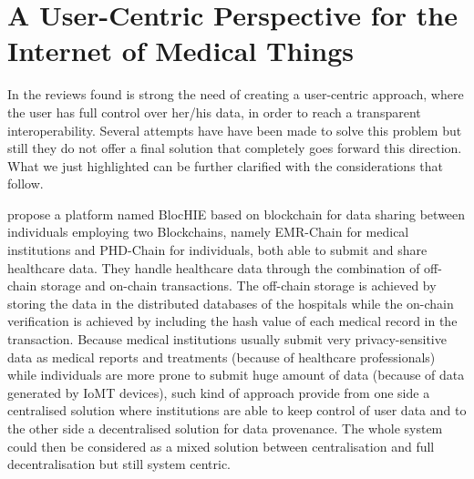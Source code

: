 \documentclass[preprint]{elsarticle}
\def\checkmark{\tikz\fill[scale=0.5](0,.35) -- (.25,0) -- (1,.7) -- (.25,.15) -- cycle;}
\begin{document}

\section{A User-Centric Perspective for the Internet of Medical Things}
In the reviews found is strong the need of creating a user-centric approach, where the user has full control over her/his data, in order to reach a transparent interoperability. Several attempts have have been made to solve this problem but still they do not offer a final solution that completely goes forward this direction. What we just highlighted can be further clarified with the considerations that follow.

\citet{jiang2018blochie} propose a platform named BlocHIE based on blockchain for data sharing between individuals employing two Blockchains, namely EMR-Chain for medical institutions and PHD-Chain for individuals, both able to submit and share healthcare data. They handle healthcare data through the combination of off-chain storage and on-chain transactions. The off-chain storage is achieved by storing the data in the distributed databases of the hospitals while the on-chain verification is achieved by including the hash value of each medical record in the transaction. 
Because medical institutions usually submit very privacy-sensitive data as medical reports and treatments (because of healthcare professionals) while individuals are more prone to submit huge amount of data (because of data generated by IoMT devices), such kind of approach provide from one side a centralised solution where institutions are able to keep control of user data and to the other side a decentralised solution for data provenance. The whole system could then be considered as a mixed solution between centralisation and full decentralisation but still system centric.
	
\end{document}
